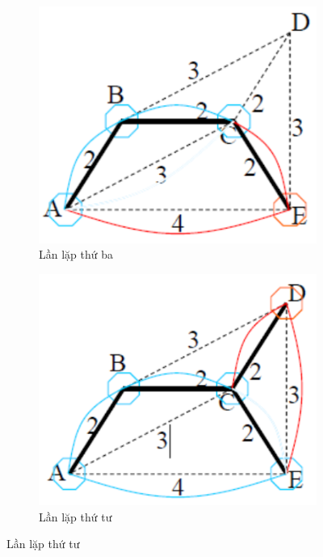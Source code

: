 \documentclass[a4paper, 11pt]{article}
\begin{document}
\begin{figure}[h]
  \bigskip
  \begin{subfigure}{.3\linewidth}
    \centering
    \includegraphics[width=\textwidth,height=\textheight,keepaspectratio]{ni_4.png}
    \caption{Lần lặp thứ ba}
  \end{subfigure}
  \hfill
  \begin{subfigure}{.3\linewidth}
    \centering
    \includegraphics[width=\textwidth,height=\textheight,keepaspectratio]{ni_5.png}
    \caption{Lần lặp thứ tư}
  \end{subfigure}

\end{figure}
\end{document}
